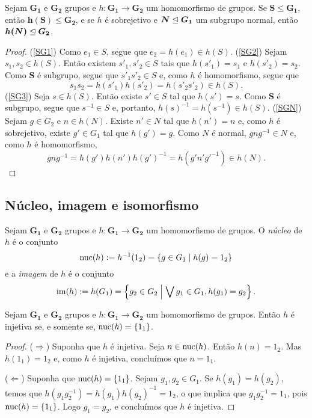 \begin{proposition}
\label{alge:prop.gru.hom}
Sejam $\bm{G_1}$ e $\bm{G_2}$ grupos e $h: \bm{G_1} \to \bm{G_2}$ um homomorfismo de grupos. Se $\bm S \leq \bm{G_1}$, então $\bm{h(S)} \leq \bm{G_2}$, e se $h$ é sobrejetivo e $\bm N \mathrel{\unlhd} \bm{G_1}$ um subgrupo normal, então $\bm{h(N)} \mathrel{\unlhd} \bm{G_2}$.
\end{proposition}
\begin{proof}
(\ref{SG1}) Como $e_1 \in S$, segue que $e_2=h(e_1) \in h(S)$.
(\ref{SG2}) Sejam $s_1,s_2 \in h(S)$. Então existem $s'_1,s'_2 \in S$ tais que $h(s'_1)=s_1$ e $h(s'_2)=s_2$. Como $\bm S$ é subgrupo, segue que $s'_1s'_2 \in S$ e, como $h$ é homomorfismo, segue que
	\begin{equation*}
	s_1s_2 = h(s'_1)h(s'_2) = h(s'_2s'_2) \in h(S).
	\end{equation*}
(\ref{SG3}) Seja $s \in h(S)$. Então existe $s' \in S$ tal que $h(s')=s$. Como $\bm S$ é subgrupo, segue que $s^{-1} \in S$ e, portanto, $h(s)^{-1} = h(s^{-1}) \in h(S)$. (\ref{SGN}) Sejam $g \in G_2$ e $n \in h(N)$. Existe $n' \in N$ tal que $h(n')=n$ e, como $h$ é sobrejetivo, existe $g' \in G_1$ tal que $h(g')=g$. Como $N$ é normal, $gng^{-1} \in N$ e, como $h$ é homomorfismo,
	\begin{equation*}
	gng^{-1} = h(g')h(n')h(g')^{-1} = h(g'n'g'^{-1}) \in h(N).
	\end{equation*}
\end{proof}

\subsection{Núcleo, imagem e isomorfismo}

\begin{definition}
Sejam $\bm{G_1}$ e $\bm{G_2}$ grupos e $h: \bm{G_1} \to \bm{G_2}$ um homomorfismo de grupos. O \emph{núcleo} de $h$ é o conjunto
	\begin{equation*}
	\operatorname{nuc}(h) := h^{-1}(1_2) = \left\{{g \in G_1}\;\middle\vert\;{h(g) = 1_2}\right\}
	\end{equation*}
e a \emph{imagem} de $h$ é o conjunto
	\begin{equation*}
	\operatorname{im}(h) := h(G_1) = \left\{{g_2 \in G_2}\;\middle\vert\;{\bigvee\nolimits g_1 \in G_1, h(g_1) = g_2}\right\}.
	\end{equation*}
\end{definition}

\begin{proposition}
\label{pro:gru.nuc.inj}
Sejam $\bm{G_1}$ e $\bm{G_2}$ grupos e $h: \bm{G_1} \to \bm{G_2}$ um homomorfismo de grupos. Então $h$ é injetiva se, e somente se, $\operatorname{nuc}(h)=\{1_1\}$.
\end{proposition}
\begin{proof}
($\Rightarrow$)	Suponha que $h$ é injetiva. Seja $n \in \operatorname{nuc}(h)$. Então $h(n)=1_2$. Mas $h(1_1)=1_2$ e, como $h$ é injetiva, concluímos que $n=1_1$.

\noindent
($\Leftarrow$) Suponha que $\operatorname{nuc}(h)=\{1_1\}$. Sejam $g_1,g_2 \in G_1$. Se $h(g_1)=h(g_2)$, temos que $h(g_1 g_2^{-1}) = h(g_1) h(g_2)^{-1} = 1_2$, o que implica que $g_1 g_2^{-1} = 1_1$, pois $\operatorname{nuc}(h)=\{1_1\}$. Logo $g_1=g_2$, e concluímos que $h$ é injetiva.
\end{proof}

